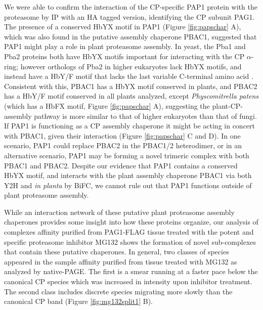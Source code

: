 We were able to confirm the interaction of the CP-specific PAP1 protein with the proteasome by IP with an HA tagged version, identifying the CP subunit PAG1. The presence of a conserved HbYX motif in PAP1 (Figure \ref{fig:papschar} A), which was also found in the putative assembly chaperone PBAC1, suggested that PAP1 might play a role in plant proteasome assembly. In yeast, the Pba1 and Pba2 proteins both have HbYX motifs important for interacting with the CP $\alpha$-ring; however orthologs of Pba2 in higher eukaryotes lack HbYX motifs, and instead have a HbY/F motif that lacks the last variable C-terminal amino  acid \citep{kusmierczyk11}. Consistent with this, PBAC1 has a HbYX motif conserved in plants, and PBAC2 has a HbY/F motif conserved in all plants analyzed, except \textit{Physcomitrella patens} (which has a HbFX motif, Figure \ref{fig:papschar} A), suggesting the plant-CP-assembly pathway is more similar to that of higher eukaryotes than that of fungi. If PAP1 is functioning as a CP assembly chaperone it might be acting in concert with PBAC1, given their interaction (Figure \ref{fig:papschar} C and D). In one scenario, PAP1 could replace PBAC2 in the PBAC1/2 heterodimer, or in an alternative scenario, PAP1 may be forming a novel trimeric complex with both PBAC1 and PBAC2. Despite our evidence that PAP1 contains a conserved HbYX motif, and interacts with the plant assembly chaperone PBAC1 via both Y2H and \textit{in planta} by BiFC, we cannot rule out that PAP1 functions outside of plant proteasome assembly.

While an interaction network of these putative plant proteasome assembly chaperones provides some insight into how these proteins organize, our analysis of complexes affinity purified from PAG1-FLAG tissue treated with the potent and specific proteasome inhibitor MG132 shows the formation of novel sub-complexes that contain these putative chaperones. In general, two classes of species appeared in the sample affinity purified from tissue treated with MG132 as analyzed by native-PAGE. The first is a smear running at a faster pace below the canonical CP species which was increased in intensity upon inhibitor treatment. The second class includes discrete species migrating more slowly than the canonical CP band (Figure \ref{fig:mg132split1} B). 

